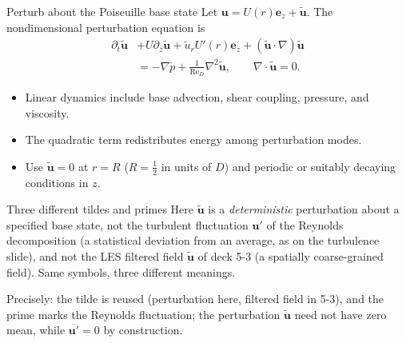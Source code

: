 \documentclass[aspectratio=169,11pt]{beamer}
\newcommand{\Rey}{\mathrm{Re}}
\newcommand{\uu}{\bm{u}}
\newcommand{\mean}[1]{\overline{#1}}
\begin{document}
\begin{frame}{Perturb about the Poiseuille base state}
Let $\uu=U(r)\bm e_z+\widetilde{\uu}$. The nondimensional perturbation equation is
\begin{align*}
  \partial_t\widetilde{\uu}
  &+U\partial_z\widetilde{\uu}
  +\widetilde u_rU'(r)\bm e_z
  +(\widetilde{\uu}\cdot\nabla)\widetilde{\uu}\\
  &=-\nabla\widetilde p+\frac1{\Rey_D}\nabla^2\widetilde{\uu},
  \qquad \nabla\cdot\widetilde{\uu}=0.
\end{align*}

\begin{itemize}\itemsep3pt
  \item Linear dynamics include base advection, shear coupling, pressure, and viscosity.
  \item The quadratic term redistributes energy among perturbation modes.
  \item Use $\widetilde{\uu}=0$ at $r=R$ ($R=\tfrac12$ in units of $D$) and periodic or suitably decaying conditions in $z$.
\end{itemize}

\begin{alertblock}{Three different tildes and primes}
Here $\widetilde{\uu}$ is a \emph{deterministic} perturbation about a specified base state, not the turbulent fluctuation $\uu'$ of the Reynolds decomposition (a statistical deviation from an average, as on the turbulence slide), and not the LES filtered field $\widetilde{\uu}$ of deck 5-3 (a spatially coarse-grained field). Same symbols, three different meanings.
{\footnotesize Precisely: the tilde is reused (perturbation here, filtered field in 5-3), and the prime marks the Reynolds fluctuation; the perturbation $\widetilde{\uu}$ need not have zero mean, while $\mean{\uu'}=0$ by construction.\par}
\end{alertblock}
\end{frame}
\end{document}
